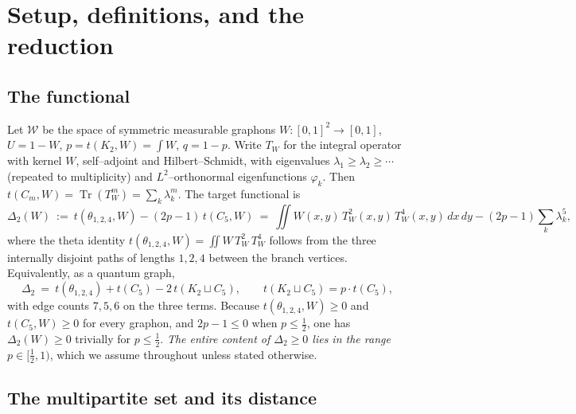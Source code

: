 \documentclass[11pt]{article}
\theoremstyle{definition}
\newcommand{\Tr}{\operatorname{Tr}}
\newcommand{\tw}{T_W}
\begin{document}
\tableofcontents

\section{Setup, definitions, and the reduction}\label{sec:setup}

\subsection{The functional}
Let $\mathcal W$ be the space of symmetric measurable graphons $W:[0,1]^2\to[0,1]$,
$U=1-W$, $p=t(K_2,W)=\int W$, $q=1-p$.  Write $\tw$ for the integral operator with
kernel $W$, self--adjoint and Hilbert--Schmidt, with eigenvalues
$\lambda_1\ge\lambda_2\ge\cdots$ (repeated to multiplicity) and $L^2$--orthonormal
eigenfunctions $\varphi_k$.  Then $t(C_m,W)=\Tr(\tw^m)=\sum_k\lambda_k^m$.  The
target functional is
\begin{equation}\label{eq:def}
  \Delta_2(W)\ :=\ t(\theta_{1,2,4},W)-(2p-1)\,t(C_5,W)
  \ =\ \iint W(x,y)\,\tw^2(x,y)\,\tw^4(x,y)\,dx\,dy-(2p-1)\sum_k\lambda_k^5 ,
\end{equation}
where the theta identity $t(\theta_{1,2,4},W)=\iint W\,\tw^2\,\tw^4$ follows from
the three internally disjoint paths of lengths $1,2,4$ between the branch vertices.
Equivalently, as a quantum graph,
\begin{equation}\label{eq:quantum}
  \Delta_2\ =\ t(\theta_{1,2,4})+t(C_5)-2\,t(K_2\sqcup C_5),\qquad
  t(K_2\sqcup C_5)=p\cdot t(C_5),
\end{equation}
with edge counts $7,5,6$ on the three terms.  Because $t(\theta_{1,2,4},W)\ge0$
and $t(C_5,W)\ge0$ for every graphon, and $2p-1\le0$ when $p\le\tfrac12$, one has
$\Delta_2(W)\ge0$ trivially for $p\le\tfrac12$.  \emph{The entire content of
$\Delta_2\ge0$ lies in the range $p\in[\tfrac12,1)$}, which we assume throughout
unless stated otherwise.

\subsection{The multipartite set and its distance}
\end{document}
